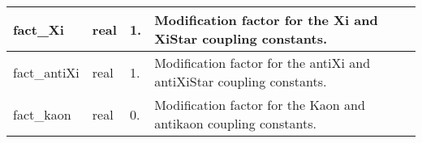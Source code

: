 \documentclass{article}
\begin{document}
\begin{longtable}{llll}
\midrule
fact\_Xi & \begin{minipage}[t]{2cm}real\end{minipage} & \begin{minipage}[t]{2cm}1.\end{minipage} & \begin{minipage}[t]{12cm}Modification factor for the Xi and XiStar coupling constants.\end{minipage}\\*
\midrule
fact\_antiXi & \begin{minipage}[t]{2cm}real\end{minipage} & \begin{minipage}[t]{2cm}1.\end{minipage} & \begin{minipage}[t]{12cm}Modification factor for the antiXi and antiXiStar coupling constants.\end{minipage}\\*
\midrule
fact\_kaon & \begin{minipage}[t]{2cm}real\end{minipage} & \begin{minipage}[t]{2cm}0.\end{minipage} & \begin{minipage}[t]{12cm}Modification factor for the Kaon and antikaon coupling constants.\end{minipage}\\*
\bottomrule
\end{longtable}
{ }



\end{document}
